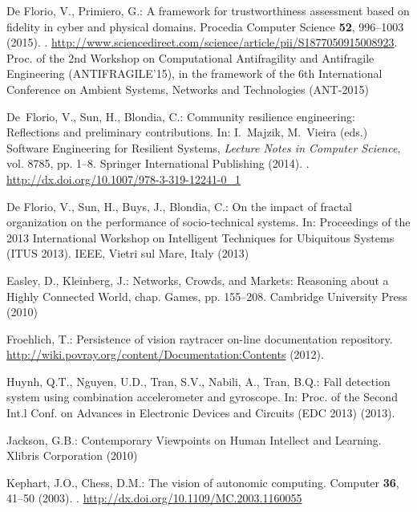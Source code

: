 \documentclass[twocolumn]{svjour3}
\begin{document}
\begin{thebibliography}{10}
{De Florio}, V., Primiero, G.: A framework for trustworthiness assessment based
  on fidelity in cyber and physical domains.
\newblock Procedia Computer Science \textbf{52}, 996--1003 (2015).
\newblock {}.
\newblock
  \urlprefix\url{http://www.sciencedirect.com/science/article/pii/S1877050915008923}.
\newblock Proc. of the 2nd Workshop on Computational Antifragility and
  Antifragile Engineering (ANTIFRAGILE'15), in the framework of the 6th
  International Conference on Ambient Systems, Networks and Technologies
  (ANT-2015)

{De~Florio}, V., Sun, H., Blondia, C.: Community resilience engineering:
  Reflections and preliminary contributions.
\newblock In: I.~Majzik, M.~Vieira (eds.) Software Engineering for Resilient
  Systems, \emph{Lecture Notes in Computer Science}, vol. 8785, pp. 1--8.
  Springer International Publishing (2014).
\newblock {}.
\newblock \urlprefix\url{http://dx.doi.org/10.1007/978-3-319-12241-0_1}

{De Florio}, V., Sun, H., Buys, J., Blondia, C.: On the impact of fractal
  organization on the performance of socio-technical systems.
\newblock In: Proceedings of the 2013 International Workshop on Intelligent
  Techniques for Ubiquitous Systems (ITUS 2013). IEEE, Vietri sul Mare, Italy
  (2013)

Easley, D., Kleinberg, J.: Networks, Crowds, and Markets: Reasoning about a
  Highly Connected World, chap. Games, pp. 155--208.
\newblock Cambridge University Press (2010)

Froehlich, T.: Persistence of vision raytracer on-line documentation
  repository.
\newblock \url{http://wiki.povray.org/content/Documentation:Contents} (2012).

Huynh, Q.T., Nguyen, U.D., Tran, S.V., Nabili, A., Tran, B.Q.: Fall detection
  system using combination accelerometer and gyroscope.
\newblock In: Proc. of the Second Int.l Conf. on Advances in Electronic Devices
  and Circuits (EDC 2013) (2013).
\newblock {}

Jackson, G.B.: Contemporary Viewpoints on Human Intellect and Learning.
\newblock Xlibris Corporation (2010)

Kephart, J.O., Chess, D.M.: The vision of autonomic computing.
\newblock Computer \textbf{36}, 41--50 (2003).
\newblock {}.
\newblock \urlprefix\url{http://dx.doi.org/10.1109/MC.2003.1160055}


\end{thebibliography}
\end{document}

